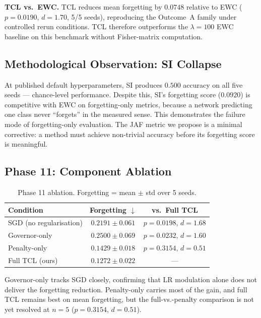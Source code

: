 \textbf{TCL vs.\ EWC.} TCL reduces mean forgetting by $0.0748$ relative to EWC
($p = 0.0190$, $d = 1.70$, 5/5 seeds), reproducing the Outcome~A family under
controlled rerun conditions. TCL therefore outperforms the $\lambda=100$ EWC
baseline on this benchmark without Fisher-matrix computation.

\subsection{Methodological Observation: SI Collapse}
\label{sec:si-collapse}

At published default hyperparameters, SI produces $0.500$ accuracy on all five seeds
--- chance-level performance. Despite this, SI's forgetting score ($0.0920$) is
competitive with EWC on forgetting-only metrics, because a network predicting one class
never ``forgets'' in the measured sense. This demonstrates the failure mode of
forgetting-only evaluation. The JAF metric we propose is a minimal corrective: a method
must achieve non-trivial accuracy before its forgetting score is meaningful.

\subsection{Phase 11: Component Ablation}
\label{sec:ablation}

\begin{table}[h]
\centering
\caption{Phase 11 ablation. Forgetting = mean $\pm$ std over 5 seeds.}
\label{tab:ablation}
\begin{tabular}{lcc}
\toprule
Condition & Forgetting $\downarrow$ & vs.\ Full TCL \\
\midrule
SGD (no regularisation) & $0.2191 \pm 0.061$ & $p=0.0198$, $d=1.68$ \\
Governor-only           & $0.2500 \pm 0.069$ & $p=0.0232$, $d=1.60$ \\
Penalty-only            & $0.1429 \pm 0.018$ & $p=0.3154$, $d=0.51$ \\
Full TCL (ours)         & $\mathbf{0.1272 \pm 0.022}$ & --- \\
\bottomrule
\end{tabular}
\end{table}

Governor-only tracks SGD closely, confirming that LR modulation alone does not
deliver the forgetting reduction. Penalty-only carries most of the gain, and
full TCL remains best on mean forgetting, but the full-vs.-penalty comparison
is not yet resolved at $n=5$ ($p = 0.3154$, $d = 0.51$).

